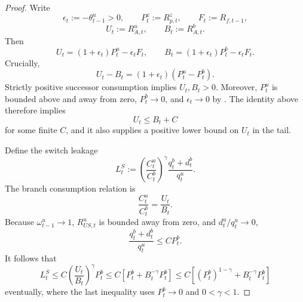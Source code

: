 \documentclass{article}
\def\green#1{#1}%
\begin{document}
\begin{proof}
Write
\[
\green{\epsilon}_t:=\green{-\theta}_{t-1}^\green{u>0},
\qquad
\green{P}_t^\green{z}:=R_{p,t}^\green{z},
\qquad
\green{F}_\green{t}:\green{=R}_{\green{f},\green{t-1}},
\]
\[
\green{U}_\green{t}:\green{=R}_{\green{A},\green{t}}^\green{u},
\qquad
\green{B}_\green{t}:\green{=R}_{\green{A},t}^b.
\]
\green{Then}
\[
\green{U}_\green{t}=(1\green{+\epsilon}_t)\green{P}_\green{t}^\green{u-\epsilon}_\green{tF}_\green{t},
\qquad
\green{B}_t\green{=}(\green{1+\epsilon}_\green{t})\green{P}_\green{t}^b\green{-\epsilon}_\green{tF}_t.
\]
\green{Crucially},
\[
\green{U}_\green{t-B}_\green{t}
\green{=}
(\green{1+\epsilon}_\green{t})(\green{P}_\green{t}^\green{u-P}_\green{t}^\green{b}).
\]
\green{Strictly positive successor consumption implies} $\green{U}_\green{t},\green{B}_\green{t>0}$.  \green{Moreover}, $\green{P}_\green{t}^u$ \green{is bounded above and away from zero}, $\green{P}_\green{t}^\green{b}\to0$, \green{and} $\green{\epsilon}_\green{t\to0}$ \green{by }.  \green{The identity above therefore implies}
\[
\green{U}_\green{t\le B}_\green{t+C}
\]
\green{for some finite} $\green{C}$, \green{and} it \green{also supplies} a \green{positive lower bound on} $\green{U}_\green{t}$ in the tail.

\green{Define} the \green{switch leakage}
\[
\green{L}_\green{t}^\green{S}
:\green{=}
\left(\frac{\green{C}_\green{t}^\green{u}}{\green{C}_t^b}\right)^\green{\gamma}
\frac{\green{q}_\green{t}^\green{b+d}_\green{t}^\green{b}}{\green{q}_\green{t}^\green{u}}.
\]
\green{The branch consumption relation is}
\[
\frac{\green{C}_\green{t}^\green{u}}{\green{C}_\green{t}^\green{b}}
=
\frac{\green{U}_t}{\green{B}_t}.
\]
\green{Because} $\green{\omega}_{\green{t-1}}^\green{u\to1}$, $\green{R}_{\green{US},t}^\green{u}$ is bounded away from zero, \green{and} $\green{d}_\green{t}^\green{u/q}_\green{t}^\green{u\to0}$,
\[
\frac{\green{q}_\green{t}^\green{b+d}_\green{t}^\green{b}}{\green{q}_\green{t}^\green{u}}
\green{\le CP}_\green{t}^\green{b}.
\]
\green{It follows that}
\begin{equation}\label{switch_leakage_intermediate}
\green{L}_\green{t}^\green{S}
\green{\le}
\green{C}\left(\frac{\green{U}_\green{t}}{\green{B}_\green{t}}\right)^\green{\gamma P}_\green{t}^\green{b}
\green{\le}
\green{C}\left[\green{P}_\green{t}^\green{b+B}_\green{t}^{\green{-\gamma}}\green{P}_\green{t}^\green{b}\right]
\green{\le}
\green{C}\left[(\green{P}_\green{t}^\green{b})^{\green{1-\gamma}}\green{+B}_\green{t}^{\green{-\gamma}}\green{P}_\green{t}^\green{b}\right]
\end{equation}
\green{eventually}, \green{where} the \green{last inequality uses} $\green{P}_\green{t}^\green{b\to0}$ \green{and} $\green{0<\gamma<1}$.


\end{proof}
\end{document}
